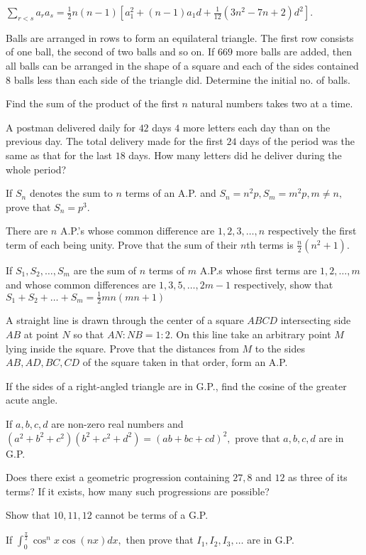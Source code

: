   $\displaystyle\sum_{r < s}a_ra_s = \frac{1}{2}n(n - 1)[a_1^2 + (n - 1)a_1d + \frac{1}{12}(3n^2 - 7n + 2)d^2]$.
\item Balls are arranged in rows to form an equilateral triangle. The first row consists of one ball, the second of two
  balls and so on. If $669$ more balls are added, then all balls can be arranged in the shape of a square and each of the sides
  contained $8$ balls less than each side of the triangle did. Determine the initial no. of balls.
\item Find the sum of the  product of the first $n$ natural numbers takes two at a time.
\item A postman delivered daily for $42$ days $4$ more letters each day than on the previous day. The total delivery made
  for the first $24$ days of the period was the same as that for the last $18$ days. How many letters did he deliver during the
  whole period?
\item If $S_n$ denotes the sum to $n$ terms of an A.P. and $S_n = n^2p, S_m = m^2p, m\neq n,$ prove that $S_n = p^3$.
\item There are $n$ A.P.'s whose common difference are $1, 2, 3, \ldots, n$ respectively the first term of each being
  unity. Prove that the sum of their $n$th terms is $\frac{n}{2}(n^2 + 1)$.
\item If $S_1, S_2, \ldots, S_m$ are the sum of $n$ terms of $m$ A.P.s whose first terms are $1, 2, \ldots, m$ and whose
  common differences are $1, 3, 5, \ldots, 2m - 1$ respectively, show that $S_1 + S_2 + \ldots + S_m = \frac{1}{2}mn(mn + 1)$
\item A straight line is drawn through the center of a square $ABCD$ intersecting side $AB$ at point $N$ so that $AN:NB =
  1:2.$ On this line take an arbitrary point $M$ lying inside the square. Prove that the distances from $M$ to the sides $AB, AD,
  BC, CD$ of the square taken in that order, form an A.P.
\item If the sides of a right-angled triangle are in G.P., find the cosine of the greater acute angle.
\item If $a, b, c, d$ are non-zero real numbers and $(a^2 + b^2 + c^2)(b^2 + c^2 + d^2) = (ab + bc + cd)^2,$ prove that
  $a, b, c, d$ are in G.P.
\item Does there exist a geometric progression containing $27, 8$ and $12$ as three of its terms? If it exists, how many
  such progressions are possible?
\item Show that $10, 11, 12$ cannot be terms of a G.P.
\item If $\displaystyle\int_0^{\frac{\pi}{2}}\cos^nx\cos(nx)dx,$ then prove that $I_1, I_2, I_3, \ldots$ are in G.P.
